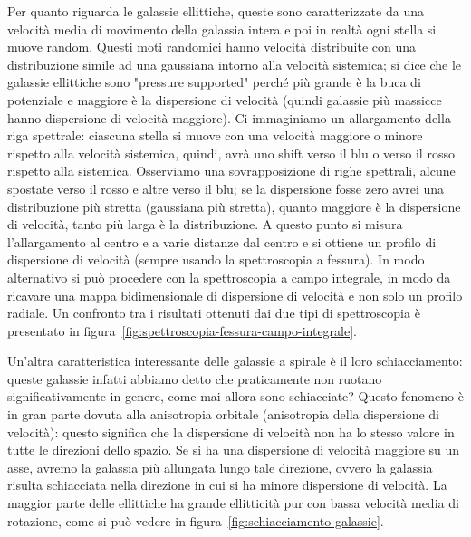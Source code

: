 Per quanto riguarda le galassie ellittiche, queste sono caratterizzate da una velocità media di movimento della galassia intera e poi in realtà ogni stella si muove random. Questi moti randomici hanno velocità distribuite con una distribuzione simile ad una gaussiana intorno alla velocità sistemica; si dice che le galassie ellittiche sono "pressure supported" perché più grande è la buca di potenziale e maggiore è la dispersione di velocità (quindi galassie più massicce hanno dispersione di velocità maggiore). Ci immaginiamo un allargamento della riga spettrale: ciascuna stella si muove con una velocità maggiore o minore rispetto alla velocità sistemica, quindi, avrà uno shift verso il blu o verso il rosso rispetto alla sistemica. Osserviamo una sovrapposizione di righe spettrali, alcune spostate verso il rosso e altre verso il blu; se la dispersione fosse zero avrei una distribuzione più stretta (gaussiana più stretta), quanto maggiore è la dispersione di velocità, tanto più larga è la distribuzione. A questo punto si misura l’allargamento al centro e a varie distanze dal centro e si ottiene un profilo di dispersione di velocità (sempre usando la spettroscopia a fessura). In modo alternativo si può procedere con la spettroscopia a campo integrale, in modo da ricavare una mappa bidimensionale di dispersione di velocità e non solo un profilo radiale. Un confronto tra i risultati ottenuti dai due tipi di spettroscopia è presentato in figura~\ref{fig:spettroscopia-fessura-campo-integrale}.

Un'altra caratteristica interessante delle galassie a spirale è il loro schiacciamento: queste galassie infatti abbiamo detto che praticamente non ruotano significativamente in genere, come mai allora sono schiacciate? Questo fenomeno è in gran parte dovuta alla anisotropia orbitale (anisotropia della dispersione di velocità): questo significa che la dispersione di velocità non ha lo stesso valore in tutte le direzioni dello spazio. Se si ha una dispersione di velocità maggiore su un asse, avremo la galassia più allungata lungo tale direzione, ovvero la galassia risulta schiacciata nella direzione in cui si ha minore dispersione di velocità. La maggior parte delle ellittiche ha grande ellitticità pur con bassa velocità media di rotazione, come si può vedere in figura~\ref{fig:schiacciamento-galassie}.

